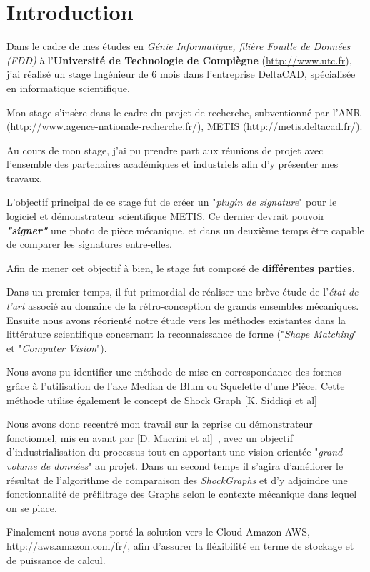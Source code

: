 \chapter*{Introduction}

Dans le cadre de mes études en \emph{Génie Informatique, filière Fouille de Données (FDD)} à l'\textbf{Université de Technologie de Compiègne} (\url{http://www.utc.fr}), j'ai réalisé un stage Ingénieur de 6 mois dans l'entreprise DeltaCAD, spécialisée en informatique scientifique. 


Mon stage s'insère dans le cadre du projet de recherche, subventionné par l'ANR (\url{http://www.agence-nationale-recherche.fr/}), METIS (\url{http://metis.deltacad.fr/}).

Au cours de mon stage, j'ai pu prendre part aux réunions de projet avec l'ensemble des partenaires académiques et industriels afin d'y présenter mes travaux.

L'objectif principal de ce stage fut de créer un "\textit{plugin de signature}" pour le logiciel et démonstrateur scientifique METIS. Ce dernier devrait pouvoir \textit{\textbf{"signer"}} une photo de pièce mécanique, et dans un deuxième temps être capable de comparer les signatures entre-elles.

Afin de mener cet objectif à bien, le stage fut composé de \textbf{différentes parties}.

Dans un premier temps, il fut primordial de réaliser une brève étude de l'\textit{état de l'art} associé au domaine de la rétro-conception de grands ensembles mécaniques.
Ensuite nous avons réorienté notre étude vers les méthodes existantes dans la littérature scientifique concernant la reconnaissance de forme ("\textit{Shape Matching}" et "\textit{Computer Vision}").

Nous avons pu identifier une méthode de mise en correspondance des formes grâce à l'utilisation de l'axe Median de Blum ou Squelette d'une Pièce. Cette méthode utilise également le concept de Shock Graph [K. Siddiqi et al]~\cite{Siddiqi1999}

Nous avons donc recentré mon travail sur la reprise du démonstrateur fonctionnel, mis en avant par [D. Macrini et al]~\cite{Macrini2002}, avec un objectif d'industrialisation du processus tout en apportant une vision orientée "\textit{grand volume de données}" au projet.
Dans un second temps il s'agira d'améliorer le résultat de l'algorithme de comparaison des \textit{ShockGraphs} et d'y adjoindre une fonctionnalité de préfiltrage des Graphs selon le contexte mécanique dans lequel on se place.

Finalement nous avons porté la solution vers le Cloud Amazon AWS, \url{http://aws.amazon.com/fr/}, afin d'assurer la fléxibilité en terme de stockage et de puissance de calcul.


